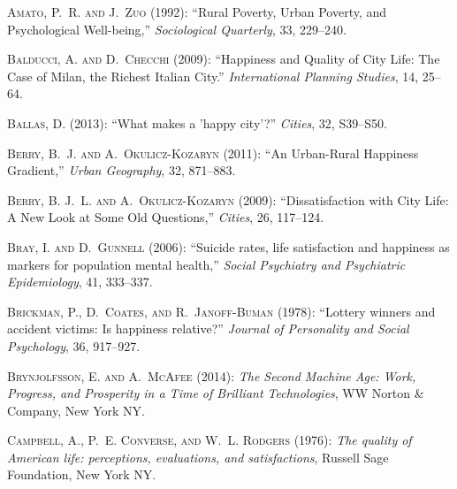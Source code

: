 \documentclass[12pt, letterpaper]{article}
\begin{document}
\begin{spacing}{1.9}
\begin{thebibliography}{77}
\textsc{Amato, P.~R. and J.~Zuo} (1992): \enquote{Rural Poverty, Urban Poverty,
  and Psychological Well-being,} \emph{Sociological Quarterly}, 33, 229--240.

\textsc{Balducci, A. and D.~Checchi} (2009): \enquote{Happiness and Quality of
  City Life: The Case of Milan, the Richest Italian City.} \emph{International
  Planning Studies}, 14, 25--64.

\textsc{Ballas, D.} (2013): \enquote{What makes a 'happy city'?} \emph{Cities},
  32, S39--S50.

\textsc{Berry, B.~J. and A.~Okulicz-Kozaryn} (2011): \enquote{An Urban-Rural
  Happiness Gradient,} \emph{Urban Geography}, 32, 871--883.

\textsc{Berry, B. J.~L. and A.~Okulicz-Kozaryn} (2009):
  \enquote{Dissatisfaction with City Life: A New Look at Some Old Questions,}
  \emph{Cities}, 26, 117--124.

\textsc{Bray, I. and D.~Gunnell} (2006): \enquote{Suicide rates, life
  satisfaction and happiness as markers for population mental health,}
  \emph{Social Psychiatry and Psychiatric Epidemiology}, 41, 333--337.

\textsc{Brickman, P., D.~Coates, and R.~Janoff-Buman} (1978): \enquote{Lottery
  winners and accident victims: Is happiness relative?} \emph{Journal of
  Personality and Social Psychology}, 36, 917--927.

\textsc{Brynjolfsson, E. and A.~McAfee} (2014): \emph{The Second Machine Age:
  Work, Progress, and Prosperity in a Time of Brilliant Technologies}, WW
  Norton \& Company, New York NY.

\textsc{Campbell, A., P.~E. Converse, and W.~L. Rodgers} (1976): \emph{The
  quality of American life: perceptions, evaluations, and satisfactions},
  Russell Sage Foundation, New York NY.


\end{thebibliography}
\end{spacing}
\end{document}
